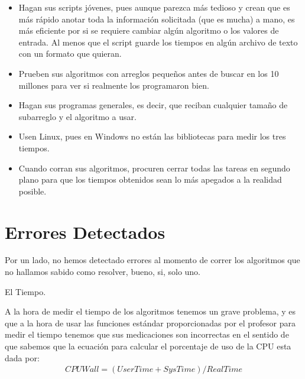 \documentclass[12pt, fleqn]{article}                             %
\theoremstyle{break}                                            %
\begin{document}
\begin{itemize}
                \begin{itemize}\setlength\itemsep{0em}
                    \item Hagan sus scripts jóvenes, pues aunque parezca más tedioso y crean que es más rápido
                        anotar toda la información solicitada (que es mucha) a mano, es más eficiente por si se
                        requiere cambiar algún algoritmo o los valores de entrada. Al menos que el script guarde
                        los tiempos en algún archivo de texto con un formato que quieran.
                    \item Prueben sus algoritmos con arreglos pequeños antes de buscar en los 10 millones para ver
                        si realmente los programaron bien.
                    \item Hagan sus programas generales, es decir, que reciban cualquier tamaño de subarreglo y
                        el algoritmo a usar.
                    \item Usen Linux, pues en Windows no están las bibliotecas para medir los tres tiempos.
                    \item Cuando corran sus algoritmos, procuren cerrar todas las tareas en segundo plano para
                        que los tiempos obtenidos sean lo más apegados a la realidad posible.
                \end{itemize}

        \end{itemize}




\clearpage
\section{Errores Detectados}

    Por un lado, no hemos detectado errores al momento de correr los algoritmos
    que no hallamos sabido como resolver, bueno, si, solo uno.

    El Tiempo.

    A la hora de medir el tiempo de los algoritmos tenemos un grave problema,
    y es que a la hora de usar las funciones estándar proporcionadas por el profesor
    para medir el tiempo tenemos que sus medicaciones son incorrectas en el sentido
    de que sabemos que la ecuación para calcular el porcentaje de uso de la CPU 
    esta dada por:
    \begin{align*}
        CPUWall = (UserTime + SysTime) / RealTime
    \end{align*}
\end{document}
